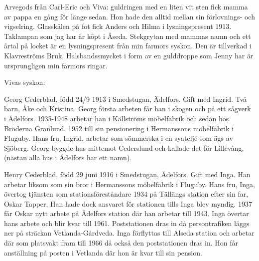 Arvegods från Carl-Eric och Viva: guldringen med en liten vit sten fick mamma av pappa en gång för länge sedan. Hon hade den alltid mellan sin förlovnings- och vigselring. Glasskålen på fot fick Anders och Hilma i lysningspresent 1913. Taklampan som jag har är köpt i Åseda.
Stekgrytan med mammas namn och ett årtal på locket är en lysningspresent från min farmors syskon. Den är tillverkad i Klavreströms Bruk.
Halsbandssmycket i form av en gulddroppe som Jenny har är ursprungligen min farmors ringar.


Vivas syskon:

Georg Cederblad, född 24/9 1913 i Smedstugan, Ädelfors. Gift med Ingrid. Två barn, Åke och Kristina.
Georg första arbeten får han i skogen och på ett sågverk i Ädelfors. 1935-1948 arbetar han i Källströms möbelfabrik och sedan hos Bröderna Granlund. 1952 till sin pensionering i Hermanssons möbelfabrik i Fluguby.
Hans fru, Ingrid, arbetar som sömmerska i en syateljé som ägs av Sjöberg.
Georg byggde hus mittemot Cederslund och kallade det för Lillevång, (nästan alla hus i Ädelfors har ett namn).

Henry Cederblad, född 29 juni 1916 i Smedstugan, Ädelfors. Gift med Inga.
Han arbetar liksom som sin bror i Hermanssons möbelfabrik i Fluguby.
Hans fru, Inga, övertog tjänsten som stationsföreståndare 1934 på Tällängs station efter sin far, Oskar Tapper. Han hade dock ansvaret för stationen tills Inga blev myndig. 1937 får Oskar nytt arbete på Ädelfors station där han arbetar till 1943. Inga övertar hans arbete och blir kvar till 1961. Poststationen dras in då persontrafiken läggs ner på sträckan Vetlanda-Gårdveda. Inga förflyttas till Alseda station och arbetar där som platsvakt fram till 1966 då också den poststationen dras in. Hon får anställning på posten i Vetlanda där hon är kvar till sin pension.

